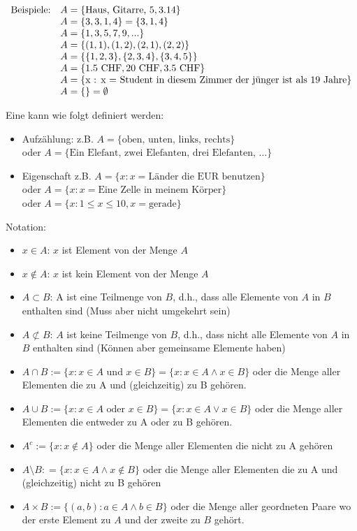 \documentclass[11pt]{article} %
\begin{document}
$\begin{array}{l l}
\textrm{Beispiele:} & A = \{\textrm{Haus, Gitarre, } 5, 3.14\}\\
   & A = \{3,3,1,4\} = \{3,1,4\}\\
& A = \{1,3,5,7,9,...\}\\
& A = \{(1,1), (1,2), (2,1), (2,2)\}\\
& A = \{\{1,2,3\},\{2,3,4\},\{3,4,5\}\}\\
& A = \{1.5 \textrm{ CHF}, 20 \textrm{ CHF}, 3.5 \textrm{ CHF}\}\\
& A = \{\textrm{x : x = Student in diesem Zimmer der jünger ist als 19 Jahre} \}\\
& A = \{\} = \emptyset
\end{array}$

Eine kann wie folgt definiert werden:
\begin{itemize}
\item Aufzählung: z.B. $A =\{\textrm{oben, unten, links, rechts}\}$ \\oder $A = \{\textrm{Ein Elefant, zwei Elefanten, drei Elefanten, ...}\}$
\item Eigenschaft z.B. $A = \{x : x = \textrm{Länder die EUR benutzen}\}$\\ oder  $A = \{x : x = \textrm{Eine Zelle in meinem Körper}\}$ \\ oder $A = \{x : 1\leq x \leq 10, x=\textrm{gerade}\}$ 
\end{itemize}

Notation:
\begin{itemize}
\item $x \in A$: $x$ ist Element von der Menge $A$
\item $x \notin A$: $x$ ist kein Element von der Menge $A$
\item $A \subset B$: A ist eine Teilmenge von $B$, d.h., dass alle Elemente von $A$ in $B$ enthalten sind (Muss aber nicht umgekehrt sein)
\item $A \not \subset B$: $A$ ist keine Teilmenge von $B$, d.h., dass nicht alle Elemente von $A$ in $B$ enthalten sind (Können aber gemeinsame Elemente haben)
\item $A \cap B:= \{x: x \in A \textrm{ und } x \in B\} = \{x: x \in A  \wedge x \in B\}$ oder die Menge aller Elementen die zu A und (gleichzeitig) zu B gehören.
\item $A \cup B:= \{x: x \in A \textrm{ oder } x \in B\} = \{x: x \in A  \vee x \in B\}$ oder die Menge aller Elementen die entweder zu A oder zu B gehören.
\item $A^c := \{x : x \notin A\}$ oder die Menge aller Elementen die nicht zu A gehören
\item $A \setminus B: = \{x: x \in A \wedge x \notin B\} $ oder die Menge aller Elementen die zu A und (gleichzeitig) nicht zu B gehören
\item $A \times B:= \{(a,b): a \in A \wedge b \in B\}$ oder die Menge aller geordneten Paare wo der erste Element zu $A$ und der zweite zu $B$ gehört.
 
\end{itemize}
\end{document}

